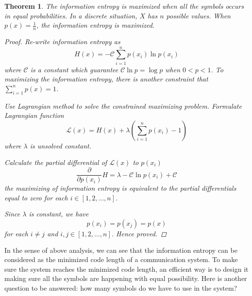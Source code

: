 \documentclass[a4paper]{article}
\newtheorem{theorem}{Theorem}[section]
\begin{document}
\begin{theorem}
    The information entropy is maximized when all the symbols occurs in equal probabilities.
    In a discrete situation, $X$ has $n$ possible values. When $p(x) = \frac{1}{n}$, the information entropy is maximized.

    \begin{proof}
        Re-write information entropy as
        \begin{equation*}
            H(x) = - \mathcal{C} \sum_{i=1}^{n} p(x_{i}) \ln{p(x_{i})}
        \end{equation*}
        where $\mathcal{C}$ is a constant which guarantee $\mathcal{C} \ln{p} = \log{p}$ when $0<p<1$.
        To maximizing the information entropy, there is another constraint that $\sum_{i=1}^{n} p(x) = 1$.

        Use Lagrangian method to solve the constrained maximizing problem.
        Formulate Lagrangian function
        \begin{equation*}
            \mathcal{L}(x) = H(x) + \lambda(\sum_{i=1}^{n} p(x_{i}) - 1)
        \end{equation*}
        where $\lambda$ is unsolved constant.

        Calculate the partial differential of $\mathcal{L}(x)$ to $p(x_{i})$
        \begin{equation*}
            \frac{\partial}{\partial{p(x_{i})}} {H} = \lambda - \mathcal{C} \ln{p(x_{i})} + \mathcal{C}
        \end{equation*}
        the maximizing of information entropy is equivalent to the partial differentials equal to zero for each $i \in [1, 2, \dots, n]$.

        Since $\lambda$ is constant, we have
        \begin{equation*}
            p(x_{i}) = p(x_{j}) = p(x)
        \end{equation*}
        for each $i \neq j$ and $i, j \in [1, 2, \dots, n]$.
        Hence proved.
    \end{proof}

\end{theorem}

In the sense of above analysis, we can see that the information entropy can be considered as the minimized code length of a communication system.
To make sure the system reaches the minimized code length, an efficient way is to design it making sure all the symbols are happening with equal possibility.
Here is another question to be answered: how many symbols do we have to use in the system?
\end{document}
